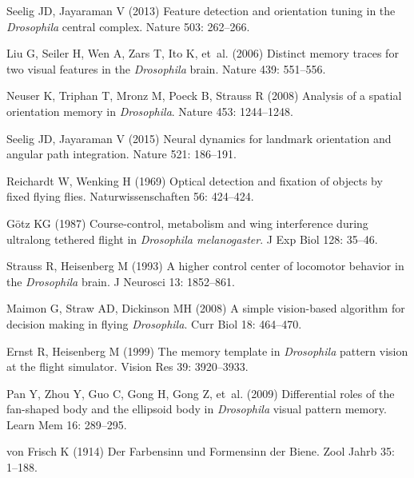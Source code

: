 \begin{thebibliography}{10}
	Seelig JD, Jayaraman V (2013) {Feature detection and orientation tuning in the
		\emph{Drosophila} central complex}.
	\newblock Nature 503: 262--266.
	
	Liu G, Seiler H, Wen A, Zars T, Ito K, et~al. (2006) Distinct memory traces for
	two visual features in the \emph{Drosophila} brain.
	\newblock Nature 439: 551--556.
	
	Neuser K, Triphan T, Mronz M, Poeck B, Strauss R (2008) Analysis of a spatial
	orientation memory in \emph{Drosophila}.
	\newblock Nature 453: 1244--1248.
	
	Seelig JD, Jayaraman V (2015) Neural dynamics for landmark orientation and
	angular path integration.
	\newblock Nature 521: 186--191.
	
	Reichardt W, Wenking H (1969) Optical detection and fixation of objects by
	fixed flying flies.
	\newblock Naturwissenschaften 56: 424--424.
	
	G{\"o}tz KG (1987) Course-control, metabolism and wing interference during
	ultralong tethered flight in \emph{Drosophila melanogaster}.
	\newblock J Exp Biol 128: 35--46.
	
	Strauss R, Heisenberg M (1993) A higher control center of locomotor behavior in
	the \emph{Drosophila} brain.
	\newblock J Neurosci 13: 1852--861.
	
	Maimon G, Straw AD, Dickinson MH (2008) A simple vision-based algorithm for
	decision making in flying \emph{Drosophila}.
	\newblock Curr Biol 18: 464--470.
	
	Ernst R, Heisenberg M (1999) The memory template in \emph{Drosophila} pattern
	vision at the flight simulator.
	\newblock Vision Res 39: 3920--3933.
	
	Pan Y, Zhou Y, Guo C, Gong H, Gong Z, et~al. (2009) {Differential roles of the
		fan-shaped body and the ellipsoid body in {\emph{Drosophila}} visual pattern
		memory}.
	\newblock Learn Mem 16: 289--295.
	
	von Frisch K (1914) {Der Farbensinn und Formensinn der Biene}.
	\newblock Zool Jahrb 35: 1--188.
	

\end{thebibliography}
